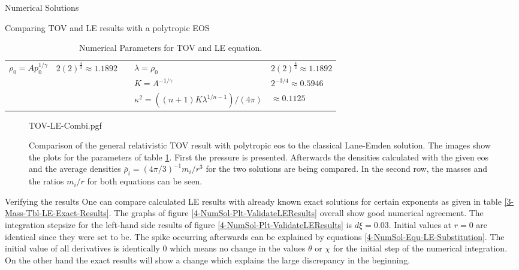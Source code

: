 \begin{section}{Numerical Solutions}
\begin{subsection}{Comparing TOV and LE results with a polytropic EOS}
\begin{table}[H]
\begin{tabular}{@{}llcll@{}}
		\cmidrule{1-2} \cmidrule{4-5}
		$\rho_0=Ap_0^{1/\gamma}$ & $2(2)^{\frac{4}{3}}\approx1.1892$ && $\lambda=\rho_0$ & $2(2)^{\frac{4}{3}}\approx1.1892$\\
		&&& $K=A^{-1/\gamma}$ & $2^{-3/4}\approx0.5946$\\
		&&& $\kappa^2=((n+1)K\lambda^{1/n-1})/(4\pi)$ & $\approx0.1125$\\
		\bottomrule
	\end{tabular}
	\caption[Numerical Parameters for TOV and LE equation]{Numerical Parameters for \ac{TOV} and \ac{LE} equation.}
	\label{4-NumSol-Tbl-TOVParameters}
\end{table}%
\begin{figure}[H]
	\centering
	{TOV-LE-Combi.pgf}
	\caption[Comparison of the TOV and LE equation]{Comparison of the general relativistic \ac{TOV} result with polytropic \ac{eos} to the classical Lane-Emden solution. 
	The images show the plots for the parameters of table \ref{4-NumSol-Tbl-TOVParameters}. 
	First the pressure is presented.
	Afterwards the densities calculated with the given \ac{eos} and the average densities $\bar{\rho}_i=(4\pi/3)^{-1}m_i/r^3$ for the two solutions are being compared.
	In the second row, the masses and the ratios $m_i/r$ for both equations can be seen.}
	\label{4-NumSol-Plt-TOVEqEasyEOS}
\end{figure}
\end{subsection}
%
%
\begin{subsection}{Verifying the results}
\label{4-NumSol-Sec-Verifiying-the-results}
One can compare calculated \ac{LE} results with already known exact  solutions for certain exponents as given in table \ref{3-Mass-Tbl-LE-Exact-Results}.
The graphs of figure \ref{4-NumSol-Plt-ValidateLEResults} overall show good numerical agreement.
The integration stepsize for the left-hand side results of figure \ref{4-NumSol-Plt-ValidateLEResults} is $d\xi=0.03$.
Initial values at $r=0$ are identical since they were set to be.
The spike occurring afterwards can be explained by equations \eqref{4-NumSol-Equ-LE-Substitution}.
The initial value of all derivatives is identically $0$ which means no change in the values $\theta$ or $\chi$ for the initial step of the numerical integration.
On the other hand the exact results will show a change which explains the large discrepancy in the beginning.

\end{subsection}
\end{section}
